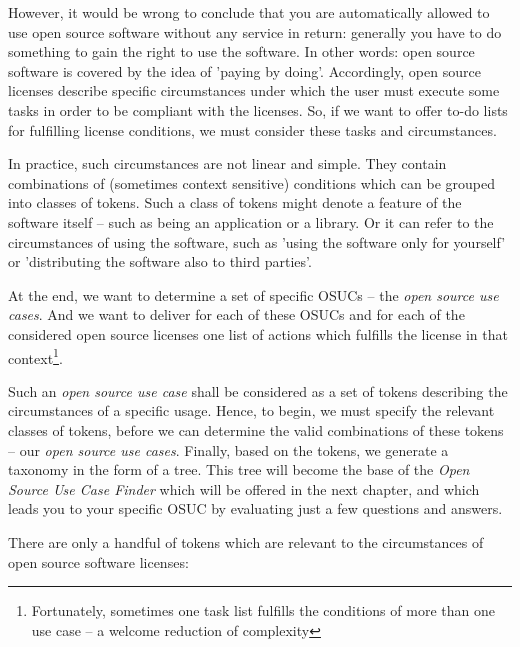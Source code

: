 However, it would be wrong to conclude that you are automatically allowed to use
open source software without any service in return: generally you have to do
something to gain the right to use the software. In other words: open source
software is covered by the idea of ’paying by doing’. Accordingly, open source
li\-cen\-ses describe specific circumstances under which the user must execute
some tasks in order to be compliant with the licenses. So, if we want to offer
to-do lists for fulfilling license conditions, we must consider these tasks and
circumstances.

In practice, such circumstances are not linear and simple. They contain
combinations of (sometimes context sensitive) conditions which can be grouped
into classes of tokens. Such a class of tokens might denote a feature of the
software itself -- such as being an application or a library. Or it can refer to
the circumstances of using the software, such as 'using the software only for
yourself' or 'distributing the software also to third parties'.

At the end, we want to determine a set of specific OSUCs -- the \emph{open source
use cases}. And we want to deliver for each of these OSUCs and for each of the
considered open source licenses one list of actions which fulfills the license
in that context\footnote{Fortunately, sometimes one task list fulfills the
conditions of more than one use case -- a welcome reduction of complexity}.

Such an \emph{open source use case} shall be considered as a set of tokens
describing the circumstances of a specific usage. Hence, to begin, we must
specify the relevant classes of tokens, before we can determine the valid
combinations of these tokens -- our \emph{open source use cases}. Finally, based
on the tokens, we generate a taxonomy in the form of a tree. This tree will
become the base of the \emph{Open Source Use Case Finder} which will be offered
in the next chapter, and which leads you to your specific OSUC by evaluating
just a few questions and answers.

There are only a handful of tokens which are relevant to the circumstances of
open source software licenses:

